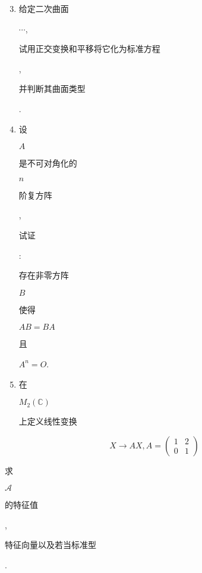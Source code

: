 \documentclass[10pt]{article}
\begin{document}
\begin{enumerate}
  \setcounter{enumi}{2}
  \item \begin{CJK}{UTF8}{mj}给定二次曲面\end{CJK} $\cdots$, \begin{CJK}{UTF8}{mj}试用正交变换和平移将它化为标准方程\end{CJK}, \begin{CJK}{UTF8}{mj}并判断其曲面类型\end{CJK}.

  \item \begin{CJK}{UTF8}{mj}设\end{CJK} $A$ \begin{CJK}{UTF8}{mj}是不可对角化的\end{CJK} $n$ \begin{CJK}{UTF8}{mj}阶复方阵\end{CJK}, \begin{CJK}{UTF8}{mj}试证\end{CJK}: \begin{CJK}{UTF8}{mj}存在非零方阵\end{CJK} $B$ \begin{CJK}{UTF8}{mj}使得\end{CJK} $A B=B A$ \begin{CJK}{UTF8}{mj}且\end{CJK} $A^{n}=O$.

  \item \begin{CJK}{UTF8}{mj}在\end{CJK} $M_{2}(\mathbb{C})$ \begin{CJK}{UTF8}{mj}上定义线性变换\end{CJK}

\end{enumerate}
$$
X \longrightarrow A X, A=\left(\begin{array}{ll}
1 & 2 \\
0 & 1
\end{array}\right)
$$
\begin{CJK}{UTF8}{mj}求\end{CJK} $\mathscr{A}$ \begin{CJK}{UTF8}{mj}的特征值\end{CJK}, \begin{CJK}{UTF8}{mj}特征向量以及若当标准型\end{CJK}.
\end{document}
